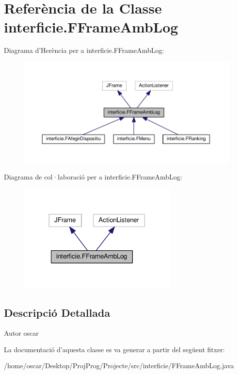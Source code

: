 \hypertarget{classinterficie_1_1_f_frame_amb_log}{\section{Referència de la Classe interficie.\+F\+Frame\+Amb\+Log}
\label{classinterficie_1_1_f_frame_amb_log}
}


Diagrama d'Herència per a interficie.\+F\+Frame\+Amb\+Log\+:
\nopagebreak
\begin{figure}[H]
\begin{center}
\leavevmode
\includegraphics[width=350pt]{classinterficie_1_1_f_frame_amb_log__inherit__graph}
\end{center}
\end{figure}


Diagrama de col·laboració per a interficie.\+F\+Frame\+Amb\+Log\+:\nopagebreak
\begin{figure}[H]
\begin{center}
\leavevmode
\includegraphics[width=228pt]{classinterficie_1_1_f_frame_amb_log__coll__graph}
\end{center}
\end{figure}


\subsection{Descripció Detallada}
\begin{DoxyAuthor}{Autor}
oscar 
\end{DoxyAuthor}


La documentació d'aquesta classe es va generar a partir del següent fitxer\+:\begin{DoxyCompactItemize}
\item 
/home/oscar/\+Desktop/\+Proj\+Prog/\+Projecte/src/interficie/F\+Frame\+Amb\+Log.\+java\end{DoxyCompactItemize}

